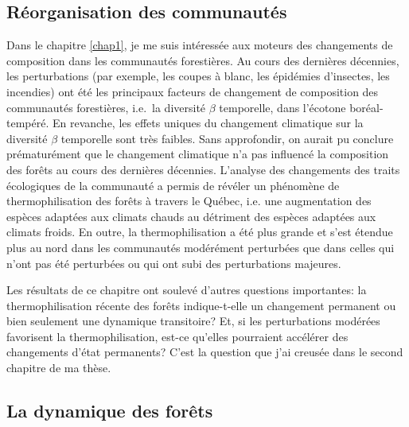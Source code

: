 \hypertarget{ruxe9organisation-des-communautuxe9s}{%
\subsection{Réorganisation des
communautés}\label{ruxe9organisation-des-communautuxe9s}}

Dans le chapitre \ref{chap1}, je me suis intéressée aux moteurs des
changements de composition dans les communautés forestières. Au cours
des dernières décennies, les perturbations (par exemple, les coupes à
blanc, les épidémies d'insectes, les incendies) ont été les principaux
facteurs de changement de composition des communautés forestières,
i.e.~la diversité \(\beta\) temporelle, dans l'écotone boréal-tempéré.
En revanche, les effets uniques du changement climatique sur la
diversité \(\beta\) temporelle sont très faibles. Sans approfondir, on
aurait pu conclure prématurément que le changement climatique n'a pas
influencé la composition des forêts au cours des dernières décennies.
L'analyse des changements des traits écologiques de la communauté a
permis de révéler un phénomène de thermophilisation des forêts à travers
le Québec, i.e. une augmentation des espèces adaptées aux climats chauds
au détriment des espèces adaptées aux climats froids. En outre, la
thermophilisation a été plus grande et s'est étendue plus au nord dans
les communautés modérément perturbées que dans celles qui n'ont pas été
perturbées ou qui ont subi des perturbations majeures.

Les résultats de ce chapitre ont soulevé d'autres questions importantes:
la thermophilisation récente des forêts indique-t-elle un changement
permanent ou bien seulement une dynamique transitoire? Et, si les
perturbations modérées favorisent la thermophilisation, est-ce qu'elles
pourraient accélérer des changements d'état permanents? C'est la
question que j'ai creusée dans le second chapitre de ma thèse.

\hypertarget{la-dynamique-des-foruxeats}{%
\subsection{La dynamique des forêts}\label{la-dynamique-des-foruxeats}}

